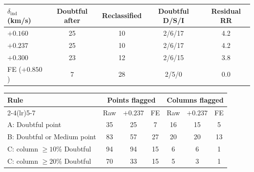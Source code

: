 \begin{tabular}{lcccc}
\toprule
$\delta_{\mathrm{ind}}$ (km/s) & Doubtful after & Reclassified & Doubtful D/S/I & Residual RR \\
\midrule
$+0.160$ & 25 & 10 & 2/6/17 & 4.2 \\
$+0.237$ & 25 & 10 & 2/6/17 & 4.2 \\
$+0.300$ & 23 & 12 & 2/6/15 & 3.8 \\
FE ($+0.850$) & 7 & 28 & 2/5/0 & 0.0 \\
\bottomrule
\end{tabular}

\begin{tabular}{lcccccc}
\toprule
Rule & \multicolumn{3}{c}{Points flagged} & \multicolumn{3}{c}{Columns flagged} \\
\cmidrule(lr){2-4}\cmidrule(lr){5-7}
 & Raw & $+0.237$ & FE & Raw & $+0.237$ & FE \\
\midrule
A: Doubtful point & 35 & 25 & 7 & 16 & 15 & 5 \\
B: Doubtful or Medium point & 83 & 57 & 27 & 20 & 20 & 13 \\
C: column $\geq 10\%$ Doubtful & 94 & 94 & 15 & 6 & 6 & 1 \\
C: column $\geq 20\%$ Doubtful & 70 & 33 & 15 & 5 & 3 & 1 \\
\bottomrule
\end{tabular}
